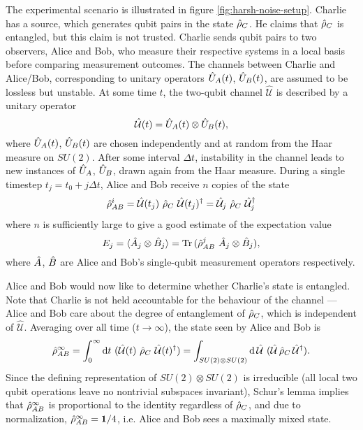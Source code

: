 \newcommand{\fullchannel}{\hat{\mathcal{U}}}
The experimental scenario is illustrated in figure \ref{fig:harsh-noise-setup}.
Charlie has a source, which generates qubit pairs in the state $\hat{\rho}_C$. He claims that $\hat{\rho}_C$ is entangled, but this claim is not trusted. Charlie sends qubit pairs to two observers, Alice and Bob, who measure their respective systems in a local basis before comparing measurement outcomes. The channels between Charlie and Alice/Bob, corresponding to unitary operators $\hat{U}_A(t)$, $\hat{U}_B(t)$, are assumed to be lossless but unstable. At some time $t$, the two-qubit channel $\fullchannel$ is described by a unitary operator 
\begin{equation}
    \fullchannel(t) = \unitary_A(t) \otimes \unitary_B(t),
\end{equation}
where $\hat{U}_A(t)$, $\hat{U}_B(t)$ are chosen independently and at random from the Haar measure on $SU(2)$. After some interval $\Delta t$, instability in the channel leads to new instances of $\hat{U}_A$, $\hat{U}_B$, drawn again from the Haar measure. During a single timestep $t_j = t_0 + j \Delta t$, Alice and Bob receive $n$ copies of the state
\begin{equation}
   \bstate^i = \fullchannel(t_j) ~ \astate ~ \fullchannel(t_j)^\dagger = \fullchannel_j ~ \astate ~ \fullchannel_j^\dagger 
\end{equation}
where $n$ is sufficiently large to give a good estimate of the expectation value
\begin{equation}
  E_j = \langle \hat{A}_j \otimes \hat{B}_j  \rangle = \text{Tr}\, ( \hat{\rho}_{AB}^j ~ \hat{A}_j \otimes \hat{B}_j ),
\end{equation}
where $\hat{A}$, $\hat{B}$ are Alice and Bob's single-qubit measurement operators  respectively.

Alice and Bob would now like to determine whether Charlie's state is entangled. Note that Charlie is not held accountable for the behaviour of the channel --- Alice and Bob care about the degree of entanglement of $\hat{\rho}_C$, which is independent of $\fullchannel$.
Averaging over all time ($t \rightarrow \infty$),  the state seen by Alice and Bob is 
\begin{equation}
    \bstate^\infty = 
   \int_0^\infty \text{d}t ~ (\fullchannel(t) ~\astate ~\fullchannel(t) ^\dagger) =
   \int_{SU(2)\otimes SU(2)} \text{d} \, \fullchannel ~ (\fullchannel \, \astate \, \fullchannel ^\dagger).
\end{equation}
Since the defining representation of $SU(2)\otimes SU(2)$ is irreducible (all local two qubit operations leave no nontrivial subspaces invariant), Schur's lemma implies that $\hat{\rho}_{AB}^\infty$ is proportional to the identity regardless of $\hat{\rho}_C$, and due to normalization, $\hat{\rho}_{AB}^\infty=\mathbf{1}/4$, i.e. Alice and Bob sees a maximally mixed state. 

